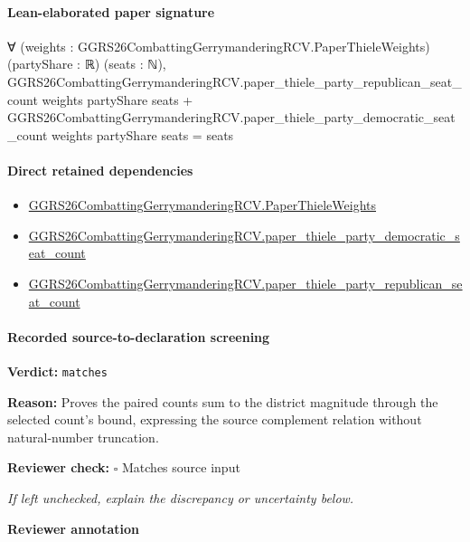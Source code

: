 \documentclass[10pt]{article}
\newcommand{\reviewerbox}{%
  \par\noindent\fbox{\parbox{0.96\linewidth}{\rule{0pt}{0.38in}}}\par
}
\newcommand{\reviewmatch}[1]{%
  \par\noindent\textbf{Reviewer check:} $\square$\; #1\par
  \noindent\emph{If left unchecked, explain the discrepancy or uncertainty below.}\par
}
\begin{document}
\paragraph{Lean-elaborated paper signature}
\begin{ReviewVerbatim}
∀ (weights : GGRS26CombattingGerrymanderingRCV.PaperThieleWeights) (partyShare : ℝ) (seats : ℕ),
  GGRS26CombattingGerrymanderingRCV.paper_thiele_party_republican_seat_count weights partyShare seats +
      GGRS26CombattingGerrymanderingRCV.paper_thiele_party_democratic_seat_count weights partyShare seats =
    seats
\end{ReviewVerbatim}

\paragraph{Direct retained dependencies}
\begin{itemize}\raggedright
\item \hyperlink{paper-prerequisite-37b91baa3b4ddc9d}{GGRS26\allowbreak{}Combatting\allowbreak{}Gerrymandering\allowbreak{}RCV.\allowbreak{}Paper\allowbreak{}Thiele\allowbreak{}Weights}
\item \hyperlink{paper-prerequisite-f7db6c9d33a2a094}{GGRS26\allowbreak{}Combatting\allowbreak{}Gerrymandering\allowbreak{}RCV.\allowbreak{}paper\_\allowbreak{}thiele\_\allowbreak{}party\_\allowbreak{}democratic\_\allowbreak{}seat\_\allowbreak{}count}
\item \hyperlink{paper-prerequisite-5fa565502cdaaed9}{GGRS26\allowbreak{}Combatting\allowbreak{}Gerrymandering\allowbreak{}RCV.\allowbreak{}paper\_\allowbreak{}thiele\_\allowbreak{}party\_\allowbreak{}republican\_\allowbreak{}seat\_\allowbreak{}count}
\end{itemize}
\paragraph{Recorded source-to-declaration screening}
\textbf{Verdict:} \texttt{matches}
\\
{\raggedright
\textbf{Reason:} Proves the paired counts sum to the district magnitude through the selected count's bound, expressing the source complement relation without natural-\allowbreak{}number truncation.\allowbreak{}
\par}
\reviewmatch{Matches source input}
\noindent\textbf{Reviewer annotation}\par
\reviewerbox
\clearpage
\hypertarget{paper-prerequisite-2324cfa92955386c}{}
\end{document}
